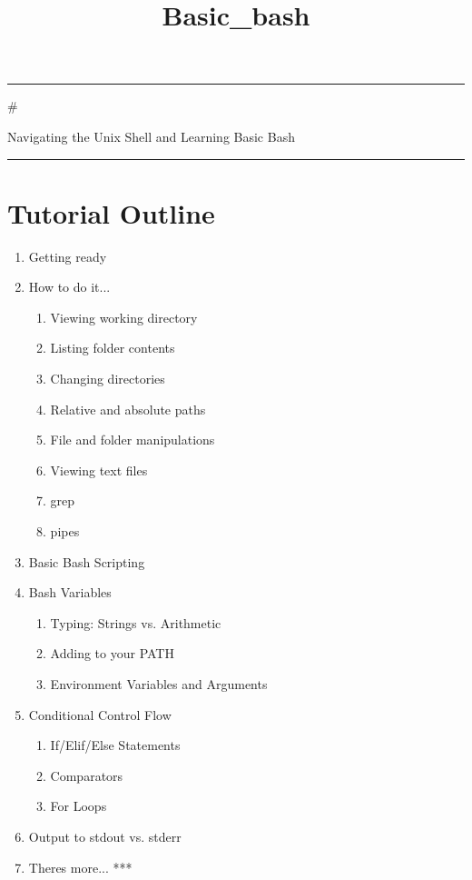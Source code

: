 \documentclass[11pt]{article}
\title{Basic\_bash}
\providecommand{\tightlist}{%
      \setlength{\itemsep}{0pt}\setlength{\parskip}{0pt}}
\begin{document}
    
    
    \maketitle
    
    

    
    \begin{center}\rule{0.5\linewidth}{\linethickness}\end{center}

\#

Navigating the Unix Shell and Learning Basic Bash

\begin{center}\rule{0.5\linewidth}{\linethickness}\end{center}

\section{Tutorial Outline}\label{tutorial-outline}

\begin{enumerate}
\def\labelenumi{\arabic{enumi}.}
\tightlist
\item
  Getting ready
\item
  How to do it...

  \begin{enumerate}
  \def\labelenumii{\arabic{enumii}.}
  \tightlist
  \item
    Viewing working directory
  \item
    Listing folder contents
  \item
    Changing directories
  \item
    Relative and absolute paths
  \item
    File and folder manipulations
  \item
    Viewing text files
  \item
    grep
  \item
    pipes
  \end{enumerate}
\item
  Basic Bash Scripting
\item
  Bash Variables

  \begin{enumerate}
  \def\labelenumii{\arabic{enumii}.}
  \tightlist
  \item
    Typing: Strings vs. Arithmetic
  \item
    Adding to your PATH
  \item
    Environment Variables and Arguments
  \end{enumerate}
\item
  Conditional Control Flow

  \begin{enumerate}
  \def\labelenumii{\arabic{enumii}.}
  \tightlist
  \item
    If/Elif/Else Statements
  \item
    Comparators
  \item
    For Loops
  \end{enumerate}
\item
  Output to stdout vs. stderr
\item
  Theres more... ***
\end{enumerate}
\end{document}
